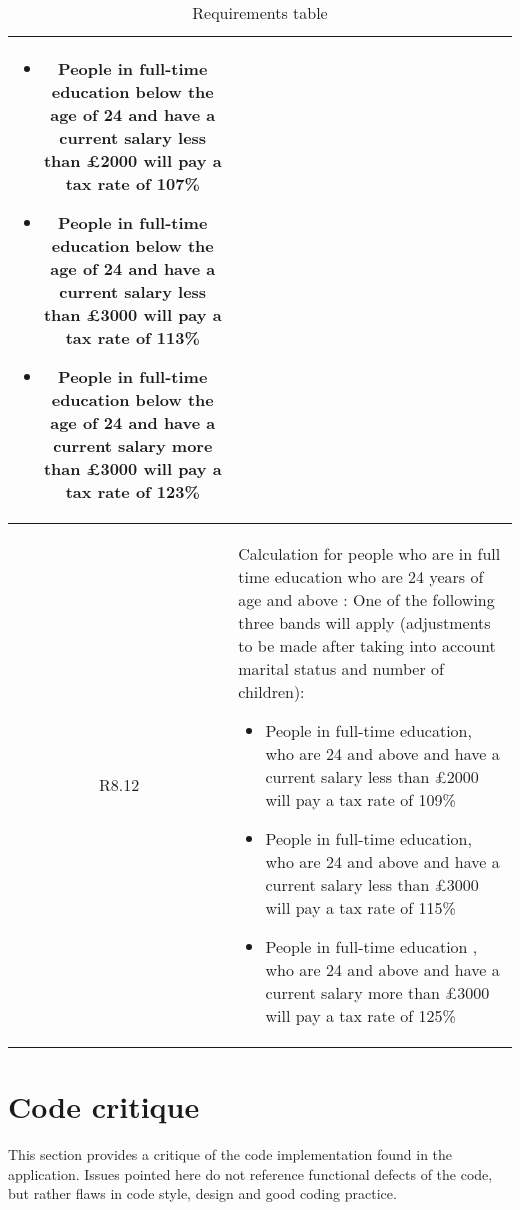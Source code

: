 \begin{table}[H]
\begin{tabularx}{\textwidth}{| c | X |}
    \begin{itemize}[itemsep=\tableitemsep, leftmargin=\tableleftsep]
        \item People in full-time education below the age of 24 and have a current salary less than £2000 will pay a tax rate of 107\%
        \item People in full-time education below the age of 24 and have a current salary less than £3000 will pay a tax rate of 113\%
        \item People in full-time education below the age of 24 and have a current salary more than £3000 will pay a tax rate of 123\%
    \end{itemize}
    \\
    \hline %
    R8.12 & Calculation for people who are in full time education who are 24 years of age and above : One of the following three bands will apply (adjustments to be made after taking into account marital status and number of children):
    \begin{itemize}[itemsep=\tableitemsep, leftmargin=\tableleftsep]
    \item People in full-time education, who are 24 and above and have a current salary less than £2000 will pay a tax rate of 109\%
    \item People in full-time education, who are 24 and above and have a current salary less than £3000 will pay a tax rate of 115\%
    \item People in full-time education , who are 24 and above and have a current salary more than £3000 will pay a tax rate of 125\%
    \end{itemize}
    \\
    \hline %
\end{tabularx}
\caption{Requirements table}
\end{table}

\pagebreak
\section{Code critique}
\label{app:code-critique}
This section provides a critique of the code implementation found in the application. Issues pointed here do not reference functional defects of the code, but rather flaws in code style, design and good coding practice. 

